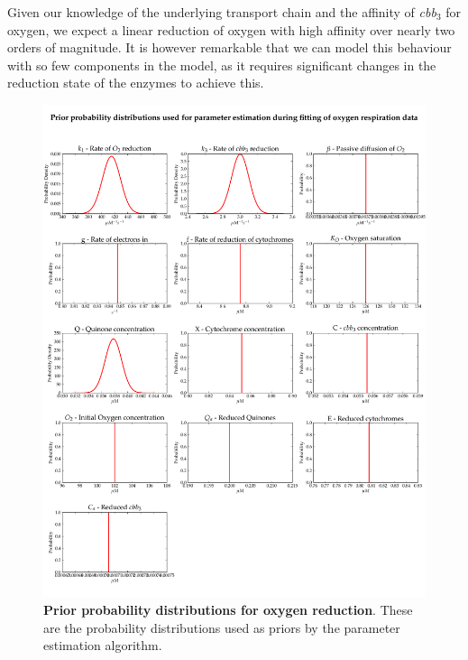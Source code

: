 Given our knowledge of the underlying transport chain and the affinity of \textit{cbb$_{\textrm{3}}$} for oxygen, we expect a linear reduction of oxygen with high affinity over nearly two orders of magnitude. It is however remarkable that we can model this behaviour with so few components in the model, as it requires significant changes in the reduction state of the enzymes to achieve this.

\begin{figure}[tbp]
 \centering
 \includegraphics[width=15cm]{./05-oxygenreduction/data/priors.pdf}
 \caption[Prior probability distributions for oxygen reduction]{{\bf Prior probability distributions for oxygen reduction}. These are the probability distributions used as priors by the parameter estimation algorithm.
 \label{fig:oxypriors}}
\end{figure}


